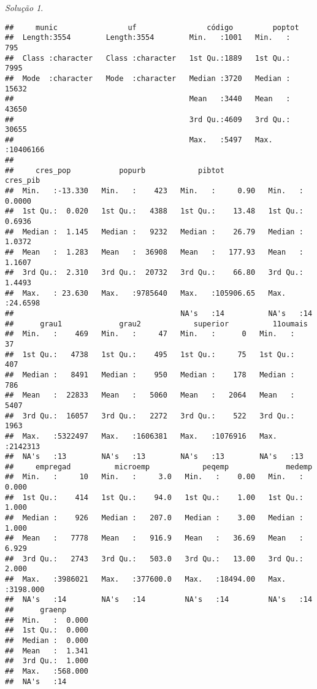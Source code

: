 \documentclass[
]{latex/krantz}
\theoremstyle{definition}
\theoremstyle{definition}
\theoremstyle{definition}
\theoremstyle{definition}
\theoremstyle{remark}
\newtheorem*{solution}{Solução}
\begin{document}
\begin{solution}
\begin{verbatim}
##     munic                uf                código         poptot        
##  Length:3554        Length:3554        Min.   :1001   Min.   :     795  
##  Class :character   Class :character   1st Qu.:1889   1st Qu.:    7995  
##  Mode  :character   Mode  :character   Median :3720   Median :   15632  
##                                        Mean   :3440   Mean   :   43650  
##                                        3rd Qu.:4609   3rd Qu.:   30655  
##                                        Max.   :5497   Max.   :10406166  
##                                                                         
##     cres_pop           popurb            pibtot             cres_pib      
##  Min.   :-13.330   Min.   :    423   Min.   :     0.90   Min.   : 0.0000  
##  1st Qu.:  0.020   1st Qu.:   4388   1st Qu.:    13.48   1st Qu.: 0.6936  
##  Median :  1.145   Median :   9232   Median :    26.79   Median : 1.0372  
##  Mean   :  1.283   Mean   :  36908   Mean   :   177.93   Mean   : 1.1607  
##  3rd Qu.:  2.310   3rd Qu.:  20732   3rd Qu.:    66.80   3rd Qu.: 1.4493  
##  Max.   : 23.630   Max.   :9785640   Max.   :105906.65   Max.   :24.6598  
##                                      NA's   :14          NA's   :14       
##      grau1             grau2            superior          11oumais      
##  Min.   :    469   Min.   :     47   Min.   :      0   Min.   :     37  
##  1st Qu.:   4738   1st Qu.:    495   1st Qu.:     75   1st Qu.:    407  
##  Median :   8491   Median :    950   Median :    178   Median :    786  
##  Mean   :  22833   Mean   :   5060   Mean   :   2064   Mean   :   5407  
##  3rd Qu.:  16057   3rd Qu.:   2272   3rd Qu.:    522   3rd Qu.:   1963  
##  Max.   :5322497   Max.   :1606381   Max.   :1076916   Max.   :2142313  
##  NA's   :13        NA's   :13        NA's   :13        NA's   :13       
##     empregad          microemp            peqemp             medemp        
##  Min.   :     10   Min.   :     3.0   Min.   :    0.00   Min.   :   0.000  
##  1st Qu.:    414   1st Qu.:    94.0   1st Qu.:    1.00   1st Qu.:   1.000  
##  Median :    926   Median :   207.0   Median :    3.00   Median :   1.000  
##  Mean   :   7778   Mean   :   916.9   Mean   :   36.69   Mean   :   6.929  
##  3rd Qu.:   2743   3rd Qu.:   503.0   3rd Qu.:   13.00   3rd Qu.:   2.000  
##  Max.   :3986021   Max.   :377600.0   Max.   :18494.00   Max.   :3198.000  
##  NA's   :14        NA's   :14         NA's   :14         NA's   :14        
##      graenp       
##  Min.   :  0.000  
##  1st Qu.:  0.000  
##  Median :  0.000  
##  Mean   :  1.341  
##  3rd Qu.:  1.000  
##  Max.   :568.000  
##  NA's   :14
\end{verbatim}


\end{solution}
\end{document}
